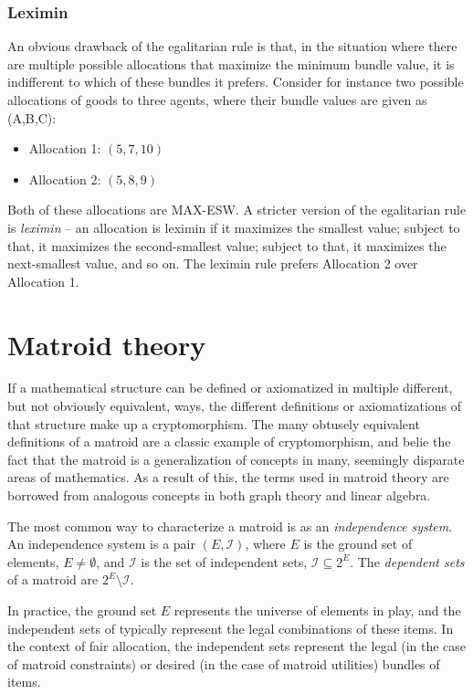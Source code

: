 \subsubsection*{Leximin}
An obvious drawback of the egalitarian rule is that, in the situation where there are multiple possible allocations that maximize the minimum bundle value, it is indifferent to which of these bundles it prefers. Consider for instance two possible allocations of goods to three agents, where their bundle values are given as (A,B,C):
\begin{itemize}
  \item Allocation 1: $(5,7,10)$
  \item Allocation 2: $(5,8,9)$
\end{itemize}
Both of these allocations are MAX-ESW. A stricter version of the egalitarian rule is \textit{leximin} -- an allocation is leximin if it maximizes the smallest value; subject to that, it maximizes the second-smallest value; subject to that, it maximizes the next-smallest value, and so on. The leximin rule prefers Allocation 2 over Allocation 1.



\section{Matroid theory}
\label{sec:matroid-theory}
If a mathematical structure can be defined or axiomatized in multiple different, but not obviously equivalent, ways, the different definitions or axiomatizations of that structure make up a cryptomorphism. The many obtusely equivalent definitions of a matroid are a classic example of cryptomorphism, and belie the fact that the matroid is a generalization of concepts in many, seemingly disparate areas of mathematics. As a result of this, the terms used in matroid theory are borrowed from analogous concepts in both graph theory and linear algebra. 

The most common way to characterize a matroid is as an \textit{independence system}. An independence system is a pair $(E, \mathcal{I})$, where $E$ is the ground set of elements, $E \not= \emptyset$, and $\mathcal{I}$ is the set of independent sets, $\mathcal{I} \subseteq 2^E$. The \textit{dependent sets} of a matroid are $2^E \setminus \mathcal{I}$. 

In practice, the ground set $E$ represents the universe of elements in play, and the independent sets of typically represent the legal combinations of these items. In the context of fair allocation, the independent sets represent the legal (in the case of matroid constraints) or desired (in the case of matroid utilities) bundles of items.

